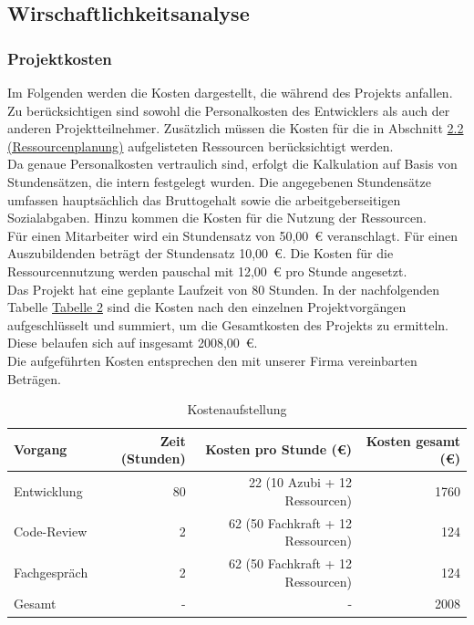 \documentclass[a4paper,12pt]{article}
\begin{document}
\subsection{Wirschaftlichkeitsanalyse}
\subsubsection{Projektkosten}
Im Folgenden werden die Kosten dargestellt, die während des Projekts anfallen. Zu berücksichtigen sind sowohl die Personalkosten des Entwicklers als auch der anderen Projektteilnehmer. Zusätzlich müssen die Kosten für die in Abschnitt \hyperref[sec:ressourcenplanung]{2.2 (Ressourcenplanung)} aufgelisteten Ressourcen berücksichtigt werden.\\
Da genaue Personalkosten vertraulich sind, erfolgt die Kalkulation auf Basis von Stundensätzen, die intern festgelegt wurden. Die angegebenen Stundensätze umfassen hauptsächlich das Bruttogehalt sowie die arbeitgeberseitigen Sozialabgaben. Hinzu kommen die Kosten für die Nutzung der Ressourcen.\\
Für einen Mitarbeiter wird ein Stundensatz von 50,00~€ veranschlagt. Für einen Auszubildenden beträgt der Stundensatz 10,00~€. Die Kosten für die Ressourcennutzung werden pauschal mit 12,00~€ pro Stunde angesetzt.\\
Das Projekt hat eine geplante Laufzeit von 80 Stunden. In der nachfolgenden Tabelle \hyperlink{Kostenaufstellung}{Tabelle 2} sind die Kosten nach den einzelnen Projektvorgängen aufgeschlüsselt und summiert, um die Gesamtkosten des Projekts zu ermitteln. Diese belaufen sich auf insgesamt 2008,00~€.\\
Die aufgeführten Kosten entsprechen den mit unserer Firma vereinbarten Beträgen.

\hypertarget{Kostenaufstellung}{}
\begin{table}[h]
\centering
\begin{tabular}{|l|r|r|r|}
\hline
\rowcolor{gray}
\textbf{Vorgang} & \textbf{Zeit (Stunden)} & \textbf{Kosten pro Stunde (€)} & \textbf{Kosten gesamt (€)} \\
\hline
Entwicklung & 80 & 22 (10 Azubi + 12 Ressourcen) & 1760 \\
\hline
Code-Review & 2 & 62 (50 Fachkraft + 12 Ressourcen) & 124 \\
\hline
Fachgespräch & 2 & 62 (50 Fachkraft + 12 Ressourcen) & 124 \\
\hline
\hline
Gesamt & - & - & 2008 \\
\hline
\end{tabular}
\caption{Kostenaufstellung}
\label{tab:Kostenaufstellung}
\end{table}
\end{document}

